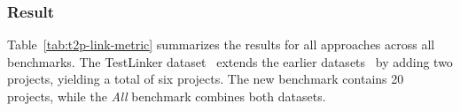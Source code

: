 





\subsubsection{Result}

Table~\ref{tab:t2p-link-metric} summarizes the results for all approaches across all benchmarks. The TestLinker dataset~\cite{sun_method-level_2024} extends the earlier datasets~\cite{white_establishing_2020,white_tctracer_2022} by adding two projects, yielding a total of six projects. The new benchmark contains 20 projects, while the \emph{All} benchmark combines both datasets.

